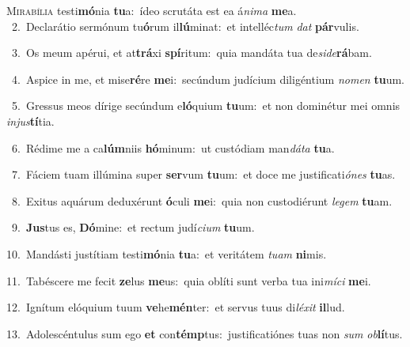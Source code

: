 \lettrine{\initial\textcolor{\initialcolor}{M}}{irabília} testi\-\textbf{mó}\-nia \textbf{tu}\-a:~\star ídeo scrutáta est ea á\-\textit{ni}\-\textit{ma} \textbf{me}\-a.\\
{\numbfont\textcolor{\numbcolor}{~2.}}~Declarátio sermónum tu\-\textbf{ó}\-rum il\-\textbf{lú}\-minat:~\star et intelléc\textit{tum} \textit{dat} \textbf{pár}\-vulis.\par
{\numbfont\textcolor{\numbcolor}{~3.}}~Os meum apérui, et at\-\textbf{trá}\-xi \textbf{spí}\-ritum:~\star quia mandáta tua de\-\textit{si}\-\textit{de}\textbf{rá}bam.\par
{\numbfont\textcolor{\numbcolor}{~4.}}~Aspice in me, et mise\-\textbf{ré}\-re \textbf{me}\-i:~\star secúndum judícium diligéntium \textit{no}\-\textit{men} \textbf{tu}\-um.\par
{\numbfont\textcolor{\numbcolor}{~5.}}~Gressus meos dírige secúndum e\-\textbf{ló}\-quium \textbf{tu}\-um:~\star et non dominétur mei omnis \textit{in}\-\textit{jus}\textbf{tí}tia.\par
{\numbfont\textcolor{\numbcolor}{~6.}}~Rédime me a ca\-\textbf{lúm}\-niis \textbf{hó}\-minum:~\star ut custódiam man\-\textit{dá}\-\textit{ta} \textbf{tu}\-a.\par
{\numbfont\textcolor{\numbcolor}{~7.}}~Fáciem tuam illúmina super \textbf{ser}\-vum \textbf{tu}\-um:~\star et doce me justificati\-\textit{ó}\-\textit{nes} \textbf{tu}\-as.\par
{\numbfont\textcolor{\numbcolor}{~8.}}~Exitus aquárum deduxérunt \textbf{ó}\-culi \textbf{me}\-i:~\star quia non custodiérunt \textit{le}\-\textit{gem} \textbf{tu}\-am.\par
{\numbfont\textcolor{\numbcolor}{~9.}}~\-\textbf{Jus}\-tus es, \textbf{Dó}\-mine:~\star et rectum judí\-\textit{ci}\-\textit{um} \textbf{tu}\-um.\par
{\numbfont\textcolor{\numbcolor}{10.}}~Mandásti justítiam testi\-\textbf{mó}\-nia \textbf{tu}\-a:~\star et veritátem \textit{tu}\-\textit{am} \textbf{ni}\-mis.\par
{\numbfont\textcolor{\numbcolor}{11.}}~Tabéscere me fecit \textbf{ze}\-lus \textbf{me}\-us:~\star quia oblíti sunt verba tua ini\-\textit{mí}\-\textit{ci} \textbf{me}\-i.\par
{\numbfont\textcolor{\numbcolor}{12.}}~Ignítum elóquium tuum \textbf{ve}\-he\-\textbf{mén}\-ter:~\star et servus tuus di\-\textit{lé}\-\textit{xit} \textbf{il}\-lud.\par
{\numbfont\textcolor{\numbcolor}{13.}}~Adolescéntulus sum ego \textbf{et} con\-\textbf{témp}\-tus:~\star justificatiónes tuas non \textit{sum} \textit{ob}\-\textbf{lí}tus.\par
